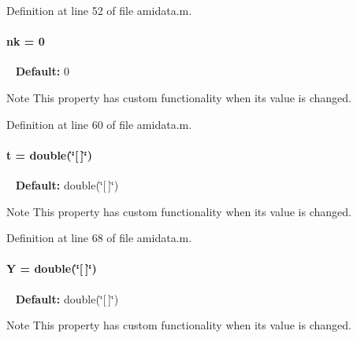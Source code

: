 Definition at line 52 of file amidata.\+m.

\hypertarget{classamidata_afd6bea572754e0c3c320664bdccf0200}{}
\paragraph[{nk}]{\setlength{\rightskip}{0pt plus 5cm}nk = 0}\label{classamidata_afd6bea572754e0c3c320664bdccf0200}
~\newline
{\bfseries Default\+:} 0

\begin{DoxyNote}{Note}
This property has custom functionality when its value is changed. 
\end{DoxyNote}


Definition at line 60 of file amidata.\+m.

\hypertarget{classamidata_aaccc9105df5383111407fd5b41255e23}{}
\paragraph[{t}]{\setlength{\rightskip}{0pt plus 5cm}t = double(\char`\"{}\mbox{[}$\,$\mbox{]}\char`\"{})}\label{classamidata_aaccc9105df5383111407fd5b41255e23}
~\newline
{\bfseries Default\+:} double(\char`\"{}\mbox{[}$\,$\mbox{]}\char`\"{})

\begin{DoxyNote}{Note}
This property has custom functionality when its value is changed. 
\end{DoxyNote}


Definition at line 68 of file amidata.\+m.

\hypertarget{classamidata_a0867f43e27585e019c13f7f4b7c4ab6b}{}
\paragraph[{Y}]{\setlength{\rightskip}{0pt plus 5cm}Y = double(\char`\"{}\mbox{[}$\,$\mbox{]}\char`\"{})}\label{classamidata_a0867f43e27585e019c13f7f4b7c4ab6b}
~\newline
{\bfseries Default\+:} double(\char`\"{}\mbox{[}$\,$\mbox{]}\char`\"{})

\begin{DoxyNote}{Note}
This property has custom functionality when its value is changed. 
\end{DoxyNote}


